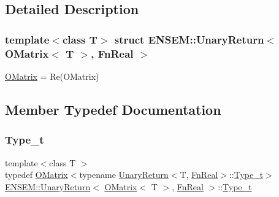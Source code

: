 \subsection{Detailed Description}
\subsubsection*{template$<$class T$>$\newline
struct E\+N\+S\+E\+M\+::\+Unary\+Return$<$ O\+Matrix$<$ T $>$, Fn\+Real $>$}

\mbox{\hyperlink{classENSEM_1_1OMatrix}{O\+Matrix}} = Re(\+O\+Matrix) 

\subsection{Member Typedef Documentation}
\mbox{\label{structENSEM_1_1UnaryReturn_3_01OMatrix_3_01T_01_4_00_01FnReal_01_4_a060b381191f238b0c1dc9189a3a14c6d}} 
\subsubsection{\texorpdfstring{Type\_t}{Type\_t}\hspace{0.1cm}{\footnotesize\ttfamily [1/3]}}
{\footnotesize\ttfamily template$<$class T $>$ \\
typedef \mbox{\hyperlink{classENSEM_1_1OMatrix}{O\+Matrix}}$<$typename \mbox{\hyperlink{structENSEM_1_1UnaryReturn}{Unary\+Return}}$<$T, \mbox{\hyperlink{structENSEM_1_1FnReal}{Fn\+Real}}$>$\+::\mbox{\hyperlink{structENSEM_1_1UnaryReturn_3_01OMatrix_3_01T_01_4_00_01FnReal_01_4_a060b381191f238b0c1dc9189a3a14c6d}{Type\+\_\+t}}$>$ \mbox{\hyperlink{structENSEM_1_1UnaryReturn}{E\+N\+S\+E\+M\+::\+Unary\+Return}}$<$ \mbox{\hyperlink{classENSEM_1_1OMatrix}{O\+Matrix}}$<$ T $>$, \mbox{\hyperlink{structENSEM_1_1FnReal}{Fn\+Real}} $>$\+::\mbox{\hyperlink{structENSEM_1_1UnaryReturn_3_01OMatrix_3_01T_01_4_00_01FnReal_01_4_a060b381191f238b0c1dc9189a3a14c6d}{Type\+\_\+t}}}

\mbox{\label{structENSEM_1_1UnaryReturn_3_01OMatrix_3_01T_01_4_00_01FnReal_01_4_a060b381191f238b0c1dc9189a3a14c6d}} 
